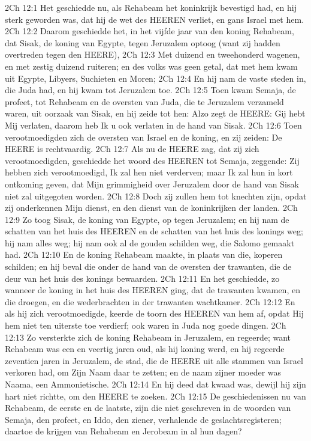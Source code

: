 2Ch 12:1  Het geschiedde nu, als Rehabeam het koninkrijk bevestigd had, en hij sterk geworden was, dat hij de wet des HEEREN verliet, en gans Israel met hem.
2Ch 12:2  Daarom geschiedde het, in het vijfde jaar van den koning Rehabeam, dat Sisak, de koning van Egypte, tegen Jeruzalem optoog (want zij hadden overtreden tegen den HEERE),
2Ch 12:3  Met duizend en tweehonderd wagenen, en met zestig duizend ruiteren; en des volks was geen getal, dat met hem kwam uit Egypte, Libyers, Suchieten en Moren;
2Ch 12:4  En hij nam de vaste steden in, die Juda had, en hij kwam tot Jeruzalem toe.
2Ch 12:5  Toen kwam Semaja, de profeet, tot Rehabeam en de oversten van Juda, die te Jeruzalem verzameld waren, uit oorzaak van Sisak, en hij zeide tot hen: Alzo zegt de HEERE: Gij hebt Mij verlaten, daarom heb Ik u ook verlaten in de hand van Sisak.
2Ch 12:6  Toen verootmoedigden zich de oversten van Israel en de koning, en zij zeiden: De HEERE is rechtvaardig.
2Ch 12:7  Als nu de HEERE zag, dat zij zich verootmoedigden, geschiedde het woord des HEEREN tot Semaja, zeggende: Zij hebben zich verootmoedigd, Ik zal hen niet verderven; maar Ik zal hun in kort ontkoming geven, dat Mijn grimmigheid over Jeruzalem door de hand van Sisak niet zal uitgegoten worden.
2Ch 12:8  Doch zij zullen hem tot knechten zijn, opdat zij onderkennen Mijn dienst, en den dienst van de koninkrijken der landen.
2Ch 12:9  Zo toog Sisak, de koning van Egypte, op tegen Jeruzalem; en hij nam de schatten van het huis des HEEREN en de schatten van het huis des konings weg; hij nam alles weg; hij nam ook al de gouden schilden weg, die Salomo gemaakt had.
2Ch 12:10  En de koning Rehabeam maakte, in plaats van die, koperen schilden; en hij beval die onder de hand van de oversten der trawanten, die de deur van het huis des konings bewaarden.
2Ch 12:11  En het geschiedde, zo wanneer de koning in het huis des HEEREN ging, dat de trawanten kwamen, en die droegen, en die wederbrachten in der trawanten wachtkamer.
2Ch 12:12  En als hij zich verootmoedigde, keerde de toorn des HEEREN van hem af, opdat Hij hem niet ten uiterste toe verdierf; ook waren in Juda nog goede dingen.
2Ch 12:13  Zo versterkte zich de koning Rehabeam in Jeruzalem, en regeerde; want Rehabeam was een en veertig jaren oud, als hij koning werd, en hij regeerde zeventien jaren in Jeruzalem, de stad, die de HEERE uit alle stammen van Israel verkoren had, om Zijn Naam daar te zetten; en de naam zijner moeder was Naama, een Ammonietische.
2Ch 12:14  En hij deed dat kwaad was, dewijl hij zijn hart niet richtte, om den HEERE te zoeken.
2Ch 12:15  De geschiedenissen nu van Rehabeam, de eerste en de laatste, zijn die niet geschreven in de woorden van Semaja, den profeet, en Iddo, den ziener, verhalende de geslachtsregisteren; daartoe de krijgen van Rehabeam en Jerobeam in al hun dagen?
